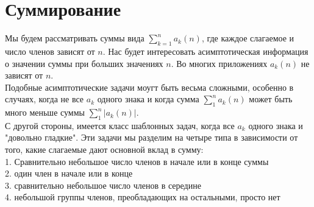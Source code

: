 \documentclass{report}
\begin{document}
\section{Суммирование}
Мы будем рассматривать суммы вида $\sum_{k=1}^{n}a_k(n)$, где каждое слагаемое и число членов зависят от $n$. Нас будет интересовать асимптотическая информация о значении суммы при
больших значениях $n$. Во многих приложениях $a_k(n)$ не зависят от $n$. \\
Подобные асимптотические задачи моугт быть весьма сложными, особенно в случаях, когда не все $a_k$ одного знака и когда сумма $\sum_{1}^{n}a_k(n)$ может быть много меньше суммы $\sum_{1}^{n}|a_k(n)|$. \\
С другой стороны, имеется класс шаблонных задач, когда все $a_k$ одного знака и "довольно гладкие". Эти задачи мы разделим на четыре типа в зависимости от того, какие слагаемые дают
основной вклад в сумму: \\
1. Сравнительно небольшое число членов в начале или в конце суммы \\
2. один член в начале или в конце \\
3. сравнительно небольшое число членов в середине \\
4. небольшой группы членов, преобладающих на остальными, просто нет \\
\newpage
\end{document}
